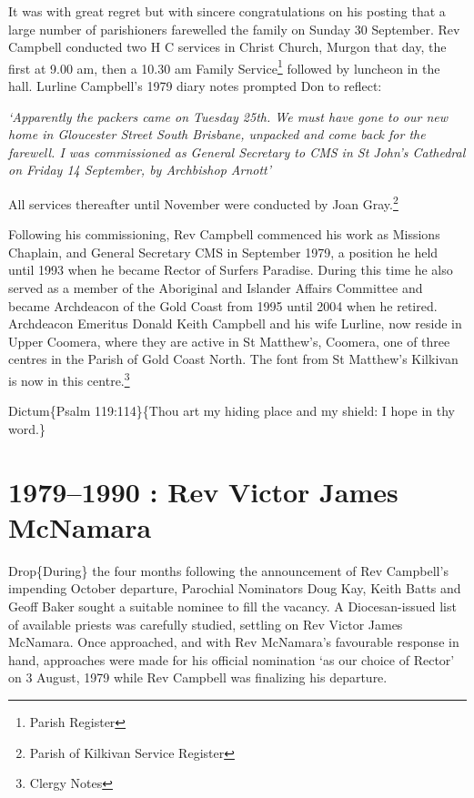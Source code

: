 It was with great regret but with sincere congratulations on his posting that a large number of parishioners farewelled the family on Sunday 30 September. Rev Campbell conducted two H C services in Christ Church, Murgon that day, the first at 9.00 am, then a 10.30 am Family Service\footnote{Parish Register} followed by luncheon in the hall. Lurline Campbell's 1979 diary notes prompted Don to reflect:

\emph{`Apparently the packers came on Tuesday 25th. We must have gone to our new home in Gloucester Street South Brisbane, unpacked and come back for the farewell. I was commissioned as General Secretary to CMS in St John's Cathedral on Friday 14 September, by Archbishop Arnott'}

All services thereafter until November were conducted by Joan Gray.\footnote{Parish of Kilkivan Service Register}

Following his commissioning, Rev Campbell commenced his work as Missions Chaplain, and General Secretary CMS in September 1979, a position he held until 1993 when he became Rector of Surfers Paradise. During this time he also served as a member of the Aboriginal and Islander Affairs Committee and became Archdeacon of the Gold Coast from 1995 until 2004 when he retired. Archdeacon Emeritus Donald Keith Campbell and his wife Lurline, now reside in Upper Coomera, where they are active in St Matthew's, Coomera, one of three centres in the Parish of Gold Coast North. The font from St Matthew's Kilkivan is now in this centre.\footnote{Clergy Notes}

Dictum\{Psalm 119:114\}\{Thou art my hiding place and my shield: I hope in thy word.\}

\hypertarget{rev-victor-james-mcnamara}{%
\chapter{1979--1990 : Rev Victor James McNamara}\label{rev-victor-james-mcnamara}}

Drop\{During\} the four months following the announcement of Rev Campbell's impending October departure, Parochial Nominators Doug Kay, Keith Batts and Geoff Baker sought a suitable nominee to fill the vacancy. A Diocesan-issued list of available priests was carefully studied, settling on Rev Victor James McNamara. Once approached, and with Rev McNamara's favourable response in hand, approaches were made for his official nomination `as our choice of Rector' on 3 August, 1979 while Rev Campbell was finalizing his departure.

